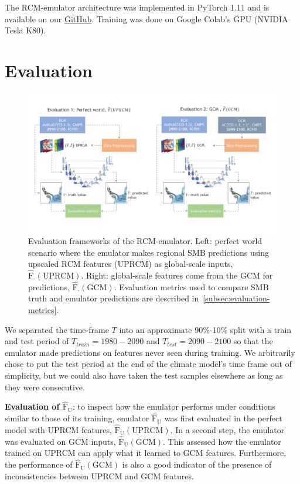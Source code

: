 \documentclass[a4paper,11pt,oneside]{report}
\begin{document}
The RCM-emulator architecture was implemented in PyTorch 1.11 and is available on our \href{https://github.com/marvande/master-thesis}{GitHub}. Training was done on Google Colab's GPU (NVIDIA Tesla K80).

\section{Evaluation}\label{sec:evaluation}

\begin{figure}[!t]
  \centering
  \includegraphics[width=\columnwidth]{doc/Thesis-latex/images/evaluation_framework.pdf}
  \caption []{\small Evaluation frameworks of the RCM-emulator. Left: perfect world scenario where the emulator makes regional SMB predictions using upscaled RCM features (UPRCM) as global-scale inputs, $\mathrm{\hat{F}_{\cdot}(UPRCM)}$. Right: global-scale features come from the GCM for predictions, $\mathrm{\hat{F}_{\cdot}(GCM)}$. Evaluation metrics used to compare SMB truth and emulator predictions are described in~\autoref{subsec:evaluation-metrics}.}
  \vspace{-3mm}
  \label{fig:evaluation-framework}
\end{figure}

We separated the time-frame $T$ into an approximate 90\%-10\% split with a train and test period of $T_{train} = 1980-2090$ and $T_{test} = 2090-2100$ so that the emulator made predictions on features never seen during training. We arbitrarily chose to put the test period at the end of the climate model's time frame out of simplicity, but we could also have taken the test samples elsewhere as long as they were consecutive. 

\textbf{Evaluation of $\mathrm{\hat{F}_U}$}: to inspect how the emulator performs under conditions similar to those of its training, emulator $\mathrm{\hat{F}_U}$ was first evaluated in the perfect model with UPRCM features, $\mathrm{\hat{F}_U(UPRCM)}$. In a second step, the emulator was evaluated on GCM inputs, $\mathrm{\hat{F}_U(GCM)}$. This assessed how the emulator trained on UPRCM can apply what it learned to GCM features. Furthermore, the performance of $\mathrm{\hat{F}_U(GCM)}$ is also a good indicator of the presence of inconsistencies between UPRCM and GCM features. 
\end{document}
